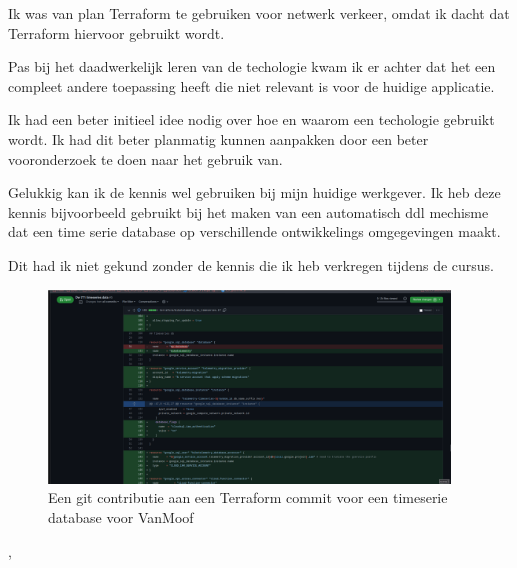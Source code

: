 {{{			Ik was van plan Terraform te gebruiken voor netwerk verkeer, omdat ik dacht dat Terraform hiervoor gebruikt wordt.

			Pas bij het daadwerkelijk leren van de techologie kwam ik er achter dat het een compleet andere toepassing heeft die niet relevant is voor de huidige applicatie.
		}
		{%

			Ik had een beter initieel idee nodig over hoe en waarom een techologie gebruikt wordt.
			Ik had dit beter planmatig kunnen aanpakken door een beter vooronderzoek te doen naar het gebruik van.

			Gelukkig kan ik de kennis wel gebruiken bij mijn huidige werkgever.
			Ik heb deze kennis bijvoorbeeld gebruikt bij het maken van een automatisch ddl mechisme dat een time serie database op verschillende ontwikkelings omgegevingen maakt.

			Dit had ik niet gekund zonder de kennis die ik heb verkregen tijdens de cursus.
		}
		{
		}
	}
	{%

		\begin{figure}[H]
			\begin{center}
				\includegraphics[width=0.95\textwidth]{images/timeseries.png}
			\end{center}
			\caption{Een git contributie aan een Terraform commit voor een timeserie database voor VanMoof}
			\label{fig:terraformcommit}
		\end{figure}

	},
}

